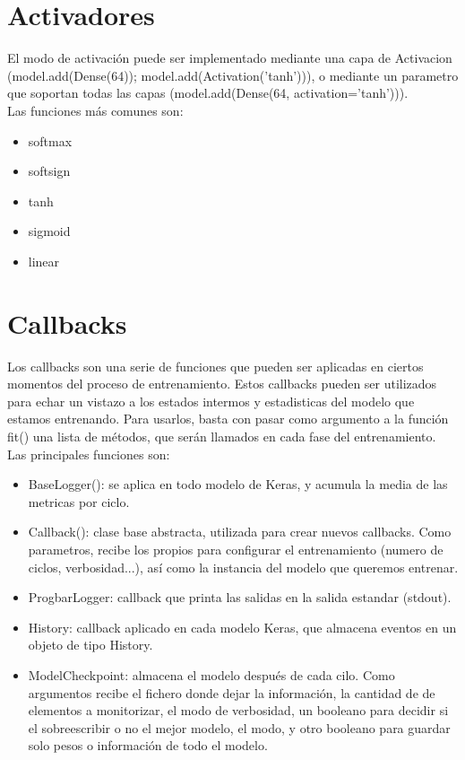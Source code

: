 \section{Activadores}
El modo de activación puede ser implementado mediante una capa de Activacion (model.add(Dense(64)); model.add(Activation('tanh'))), o mediante un parametro que soportan todas las capas (model.add(Dense(64, activation='tanh'))).\\
Las funciones más comunes son:
\begin{itemize}[noitemsep]
\item softmax
\item softsign
\item tanh
\item sigmoid
\item linear
\end{itemize}
\section{Callbacks}
Los callbacks son una serie de funciones que pueden ser aplicadas en ciertos momentos del proceso de entrenamiento. Estos callbacks pueden ser utilizados para echar un vistazo a los estados intermos y estadisticas del modelo que estamos entrenando. Para usarlos, basta con pasar como argumento a la función fit() una lista de métodos, que serán llamados en cada fase del entrenamiento.\\
Las principales funciones son:
\begin{itemize}
\item BaseLogger(): se aplica en todo modelo de Keras, y acumula la media de las metricas por ciclo.
\item Callback(): clase base abstracta, utilizada para crear nuevos callbacks. Como parametros, recibe los propios para configurar el entrenamiento (numero de ciclos, verbosidad...), así como la instancia del modelo que queremos entrenar.
\item{ProgbarLogger}: callback que printa las salidas en la salida estandar (stdout).
\item{History}: callback aplicado en cada modelo Keras, que almacena eventos en un objeto de tipo History.
\item{ModelCheckpoint}: almacena el modelo después de cada cilo. Como argumentos recibe el fichero donde dejar la información, la cantidad de de elementos a monitorizar, el modo de verbosidad, un booleano para decidir si el sobreescribir o no el mejor modelo, el modo, y otro booleano para guardar solo pesos o información de todo el modelo.
\end{itemize}
